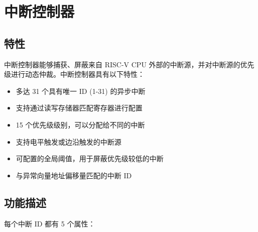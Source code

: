 \documentclass[main\_\_CN.tex]{subfiles}
\begin{document}



\clearpage
\section{中断控制器}
\label{sec:riscvcpu-int-ctrl}

\subsection{特性}
\label{sec:riscvcpu-int-features}
中断控制器能够捕获、屏蔽来自 RISC-V CPU 外部的中断源，并对中断源的优先级进行动态仲裁。中断控制器具有以下特性：

\begin{itemize}
    \item 多达 31 个具有唯一 ID (1-31) 的异步中断
    \item 支持通过读写存储器匹配寄存器进行配置
    \item 15 个优先级级别，可以分配给不同的中断
    \item 支持电平触发或边沿触发的中断源
    \item 可配置的全局阈值，用于屏蔽优先级较低的中断
    \item 与异常向量地址偏移量匹配的中断 ID
\end{itemize}


\subsection{功能描述}
\label{sec:riscvcpu-int-func-descr}

每个中断 ID 都有 5 个属性：
\end{document}
